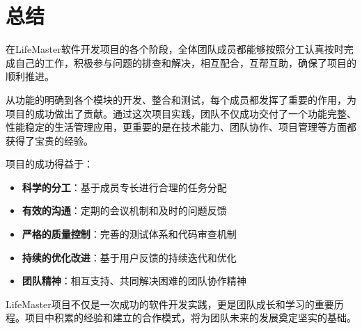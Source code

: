 \documentclass[a4paper]{article}
\begin{document}
\section{总结}

在LifeMaster软件开发项目的各个阶段，全体团队成员都能够按照分工认真按时完成自己的工作，积极参与问题的排查和解决，相互配合，互帮互助，确保了项目的顺利推进。

从功能的明确到各个模块的开发、整合和测试，每个成员都发挥了重要的作用，为项目的成功做出了贡献。通过这次项目实践，团队不仅成功交付了一个功能完整、性能稳定的生活管理应用，更重要的是在技术能力、团队协作、项目管理等方面都获得了宝贵的经验。

项目的成功得益于：

\begin{itemize}
    \item \textbf{科学的分工}：基于成员专长进行合理的任务分配
    \item \textbf{有效的沟通}：定期的会议机制和及时的问题反馈
    \item \textbf{严格的质量控制}：完善的测试体系和代码审查机制
    \item \textbf{持续的优化改进}：基于用户反馈的持续迭代和优化
    \item \textbf{团队精神}：相互支持、共同解决困难的团队协作精神
\end{itemize}

LifeMaster项目不仅是一次成功的软件开发实践，更是团队成长和学习的重要历程。项目中积累的经验和建立的合作模式，将为团队未来的发展奠定坚实的基础。
\end{document}
